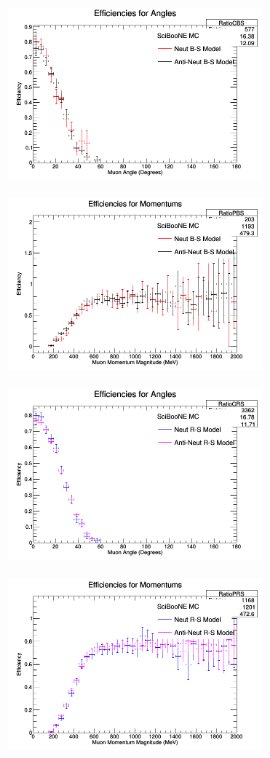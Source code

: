 \documentclass[11pt]{article}
\begin{document}
\begin{figure}[H]
\centering
\includegraphics[width=0.6\textwidth]{NMCombinedPlotsImages/18-NMCombinedPlots.png}
\caption{}
\end{figure}

\begin{figure}[H]
\centering
\includegraphics[width=0.6\textwidth]{NMCombinedPlotsImages/19-NMCombinedPlots.png}
\caption{}
\end{figure}

\begin{figure}[H]
\centering
\includegraphics[width=0.6\textwidth]{NMCombinedPlotsImages/20-NMCombinedPlots.png}
\caption{}
\end{figure}

\begin{figure}[H]
\centering
\includegraphics[width=0.6\textwidth]{NMCombinedPlotsImages/21-NMCombinedPlots.png}
\caption{}
\end{figure}
\end{document}
